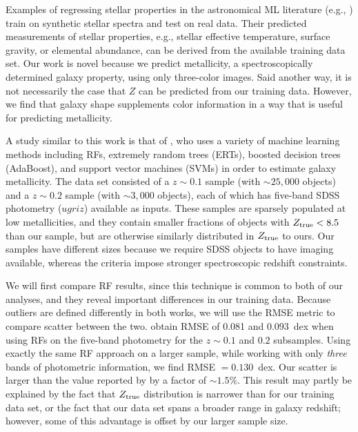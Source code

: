 \documentclass[fleqn,usenatbib]{mnras}
\newcommand{\eg}{e.g.}
\newcommand{\citeeg}[1]{(\eg, \citealt{#1})}
\begin{document}
Examples of regressing stellar properties in the astronomical ML literature \citeeg{2000A&A...357..197B, Fabbro2018} train on synthetic stellar spectra and test on real data. Their predicted measurements of stellar properties, \eg, stellar effective temperature, surface gravity, or elemental abundance, can be derived from the available training data set. Our work is novel because we predict metallicity, a spectroscopically determined galaxy property, using only three-color images. Said another way, it is not necessarily the case that $Z$ can be predicted from our training data. However, we find that galaxy shape supplements color information in a way that is useful for predicting metallicity.

A study similar to this work is that of \cite{Acquaviva2016}, who uses a variety of machine learning methods including RFs, extremely random trees (ERTs), boosted decision trees (AdaBoost), and support vector machines (SVMs) in order to estimate galaxy metallicity. The \cite{Acquaviva2016} data set consisted of a $z \sim 0.1$ sample (with $\sim 25,000$ objects) and a $z \sim 0.2$ sample (with $\sim 3,000$ objects), each of which has five-band SDSS photometry ($ugriz$) available as inputs. These samples are sparsely populated at low metallicities, and they contain smaller fractions of objects with $Z_{\rm true} < 8.5$ than our sample, but are otherwise similarly distributed in $Z_{\rm true}$ to ours. Our samples have different sizes because we require SDSS objects to have imaging available, whereas the \cite{Acquaviva2016} criteria impose stronger spectroscopic redshift constraints.

We will first compare RF results, since this technique is common to both of our analyses, and they reveal important differences in our training data. Because outliers are defined differently in both works, we will use the RMSE metric to compare scatter between the two. \cite{Acquaviva2016} obtain RMSE of 0.081 and 0.093~dex when using RFs on the five-band photometry for the $z \sim 0.1$ and $0.2$ subsamples. Using exactly the same RF approach on a larger sample, while working with only \textit{three} bands of photometric information, we find RMSE $= 0.130$~dex. Our scatter is larger than the value reported by \cite{Acquaviva2016} by a factor of $\sim 1.5\%$. This result may partly be explained by the fact that \cite{Acquaviva2016} $Z_{\rm true}$ distribution is narrower than for our training data set, or the fact that our data set spans a broader range in galaxy redshift; however, some of this advantage is offset by our larger sample size.
\end{document}
